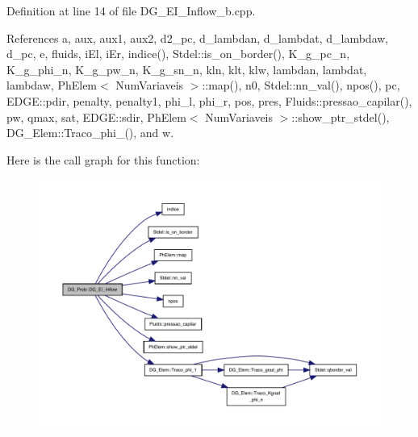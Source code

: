 Definition at line 14 of file D\+G\+\_\+\+E\+I\+\_\+\+Inflow\+\_\+b.\+cpp.



References a, aux, aux1, aux2, d2\+\_\+pc, d\+\_\+lambdan, d\+\_\+lambdat, d\+\_\+lambdaw, d\+\_\+pc, e, fluids, i\+El, i\+Er, indice(), Stdel\+::is\+\_\+on\+\_\+border(), K\+\_\+g\+\_\+pc\+\_\+n, K\+\_\+g\+\_\+phi\+\_\+n, K\+\_\+g\+\_\+pw\+\_\+n, K\+\_\+g\+\_\+sn\+\_\+n, kln, klt, klw, lambdan, lambdat, lambdaw, Ph\+Elem$<$ Num\+Variaveis $>$\+::map(), n0, Stdel\+::nn\+\_\+val(), npos(), pc, E\+D\+G\+E\+::pdir, penalty, penalty1, phi\+\_\+l, phi\+\_\+r, pos, pres, Fluids\+::pressao\+\_\+capilar(), pw, qmax, sat, E\+D\+G\+E\+::sdir, Ph\+Elem$<$ Num\+Variaveis $>$\+::show\+\_\+ptr\+\_\+stdel(), D\+G\+\_\+\+Elem\+::\+Traco\+\_\+phi\+\_(), and w.

Here is the call graph for this function\+:
\nopagebreak
\begin{figure}[H]
\begin{center}
\leavevmode
\includegraphics[width=350pt]{classDG__Prob_ae722c0b7a7d1bccc9dbc9d2333754b42_cgraph}
\end{center}
\end{figure}
\mbox{\label{classDG__Prob_a862dcc9991b9091de30323b1d2b1c5a5}} 
